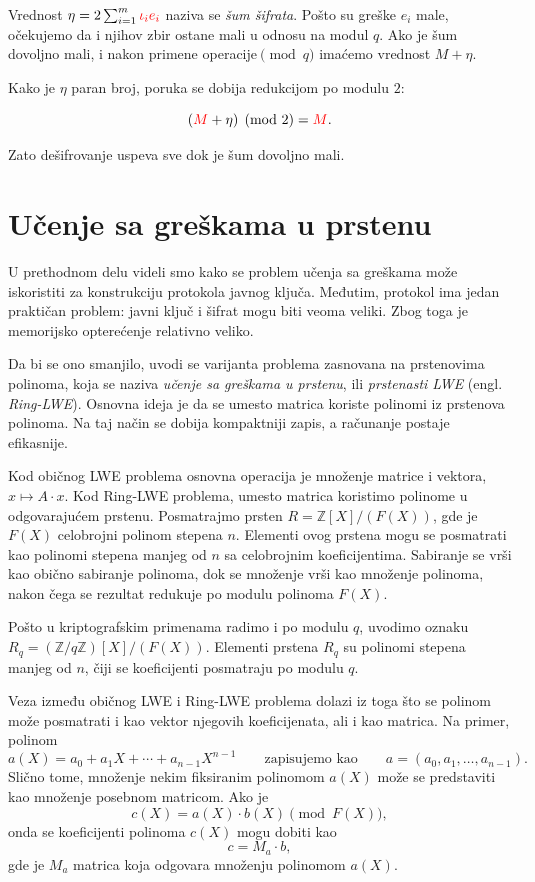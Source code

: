 Vrednost $ \eta = 2\sum_{i=1}^{m} {\color{red}\iota_i} {\color{red}e_i} $
naziva se \emph{šum šifrata}. 
Pošto su greške $e_i$ male, 
očekujemo da i njihov zbir ostane mali u odnosu na modul $q$.
Ako je šum dovoljno mali, i nakon primene operacije$\pmod q$ imaćemo vrednost $M+\eta$.

Kako je $\eta$ paran broj, poruka se dobija redukcijom po modulu $2$:

\[
    ({\color{red}M} + \eta) \pmod 2 = {\color{red}M}.
\]

Zato dešifrovanje uspeva sve dok je šum dovoljno mali.


\section{Učenje sa greškama u prstenu}

U prethodnom delu videli smo kako se problem učenja sa greškama može iskoristiti za konstrukciju protokola javnog ključa.
Međutim, protokol ima jedan praktičan problem:
javni ključ i šifrat mogu biti veoma veliki.
Zbog toga je memorijsko opterećenje relativno veliko.

Da bi se ono smanjilo, uvodi se varijanta problema zasnovana na prstenovima polinoma,
koja se naziva \emph{učenje sa greškama u prstenu}, ili \emph{prstenasti LWE} (engl. \emph{Ring-LWE}).
Osnovna ideja je da se umesto matrica koriste polinomi iz prstenova polinoma.
Na taj način se dobija kompaktniji zapis, a računanje postaje efikasnije.

Kod običnog LWE problema osnovna operacija je množenje matrice i vektora, $ x \longmapsto A \cdot x $.
Kod Ring-LWE problema, umesto matrica koristimo polinome u odgovarajućem prstenu.
Posmatrajmo prsten $ R = \mathbb{Z}[X]/(F(X)) $, gde je $F(X)$ celobrojni polinom stepena $n$.
Elementi ovog prstena mogu se posmatrati kao polinomi stepena manjeg od $n$ sa celobrojnim koeficijentima.
Sabiranje se vrši kao obično sabiranje polinoma,
dok se množenje vrši kao množenje polinoma,
nakon čega se rezultat redukuje po modulu polinoma $F(X)$.

Pošto u kriptografskim primenama radimo i po modulu $q$, uvodimo oznaku
$ R_q = (\mathbb{Z}/q\mathbb{Z})[X]/(F(X)) $.
Elementi prstena $R_q$ su polinomi stepena manjeg od $n$, čiji se koeficijenti
posmatraju po modulu $q$.

Veza između običnog LWE i Ring-LWE problema dolazi iz toga što se polinom može
posmatrati i kao vektor njegovih koeficijenata, ali i kao matrica.
Na primer, polinom
\[
    a(X) = a_0 + a_1X + \cdots + a_{n-1}X^{n-1}
    \qquad
    \text{zapisujemo kao}
    \qquad
    a = (a_0,a_1,\ldots,a_{n-1}).
\]
Slično tome, množenje nekim fiksiranim polinomom $a(X)$ može se predstaviti kao
množenje posebnom matricom.
Ako je
\[
    c(X) = a(X) \cdot b(X) \pmod {F(X)},
\]
onda se koeficijenti polinoma $c(X)$ mogu dobiti kao
\[
    c = M_a \cdot b,
\]
gde je $M_a$ matrica koja odgovara množenju polinomom $a(X)$.

